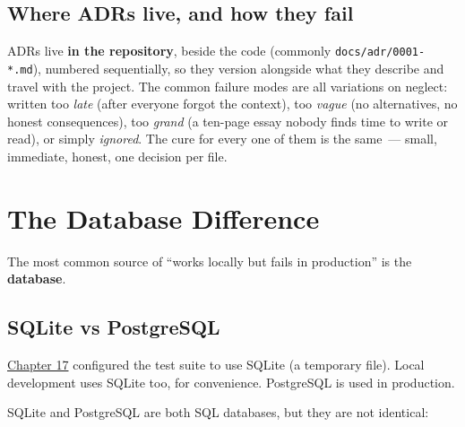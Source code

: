 \subsection*{Where ADRs live, and how they fail}\label{39-local-vs-production:where-adrs-live-and-how-they-fail}

ADRs live \textbf{in the repository}, beside the code (commonly \texttt{docs/}\allowbreak{}\texttt{adr/}\allowbreak{}\texttt{0001-*.md}), numbered sequentially, so they version alongside what they describe and travel with the project. The common failure modes are all variations on neglect: written too \emph{late} (after everyone forgot the context), too \emph{vague} (no alternatives, no honest consequences), too \emph{grand} (a ten-page essay nobody finds time to write or read), or simply \emph{ignored}. The cure for every one of them is the same~--- small, immediate, honest, one decision per file.

\setcounter{section}{1}
\section{The Database Difference}\label{39-local-vs-production:392-the-database-difference}

The most common source of ``works locally but fails in production'' is the \textbf{database}.

\subsection*{SQLite vs PostgreSQL}\label{39-local-vs-production:sqlite-vs-postgresql}

\hyperref[ch:17-build-process]{Chapter 17} configured the test suite to use SQLite (a temporary file). Local development uses SQLite too, for convenience. PostgreSQL is used in production.

SQLite and PostgreSQL are both SQL databases, but they are not identical:


